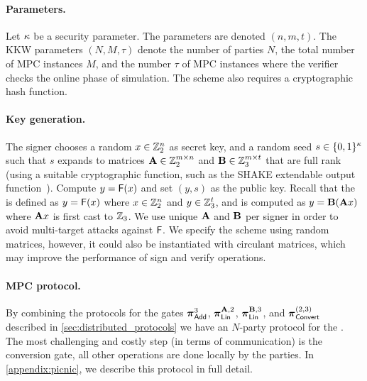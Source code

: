 \paragraph{Parameters.} Let $\kappa$ be a security parameter.  The
\ttOWF parameters are denoted $(n, m, t)$.  The KKW parameters $(N, M,
\tau)$ denote the number of parties $N$, the total number of MPC instances $M$,
and the number $\tau$ of MPC instances where the verifier checks the online
phase of simulation.  The scheme also requires a cryptographic hash function. 

\paragraph{Key generation.}
The signer chooses a random $x \in \mathbb{Z}_2^n$ as 
secret key, and a random seed $s \in \{0,1\}^{\kappa}$ such that $s$
expands to matrices $\mathbf{A} \in \mathbb{Z}_2^{m\times n}$ and $\mathbf{B}\in \mathbb{Z}_3^{m\times t}$ that are full rank (using a suitable cryptographic
function, such as the SHAKE extendable output function~\cite{sp800-185}).
Compute $y = \mathsf{F}(x)$ and set $(y, s)$ as the public key.
Recall that the \ttOWF is defined as $y = \mathsf{F}(x)$ where $x \in \mathbb{Z}_2^{n}$ and $y\in \mathbb{Z}_3^{t}$, and is computed as $y = \mat{B}(\mat{A}x)$ where $\mat{A}x$ is first cast to $\mathbb{Z}_3$. 
\iffull
We use unique $\mathbf{A}$ and $\mathbf{B}$ per signer in order to avoid multi-target attacks against $\mathsf{F}$.
We specify the scheme using random matrices, however, it could also be instantiated
with circulant matrices, which may improve the performance of sign and verify operations.
\fi

\paragraph{MPC protocol.}
By combining the protocols for the gates 
$\boldsymbol{\pi}_{\textnormal{\textsf{Add}}}^{3}$,
$\prot_{\LMap}^{\mat{A},2}$,
$\prot_{\LMap}^{\mat{B},3}$, and
$\boldsymbol{\pi}_{\textnormal{\textsf{Convert}}}^{(2,3)}$
described in \cref{sec:distributed_protocols} we have an $N$-party protocol for
the \ttOWF. The most challenging and costly step (in terms of communication) is
the conversion gate, all other operations are done locally by the parties.  In
\cref{appendix:picnic}, we describe this protocol in full detail.  

